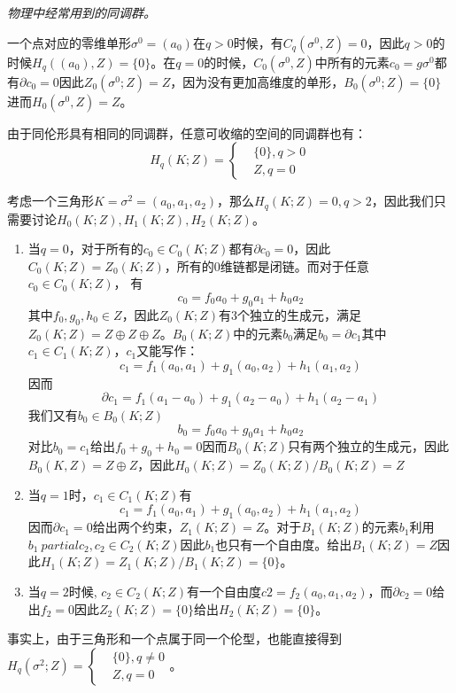 \documentclass[supercite]{HustGraduPaper}
\begin{document}
\begin{appendices}
		\textit{物理中经常用到的同调群。}
		
		一个点对应的零维单形$\sigma^0 = (a_0)$在$q>0$时候，有$C_q(\sigma^0,Z) = 0$，因此$q>0$的时候$H_q((a_0),Z) = \{0\}$。在$q = 0$的时候，$C_0(\sigma^0,Z)$中所有的元素$c_0 = g \sigma^0$都有$\partial c_0 = 0$因此$Z_0(\sigma^0;Z) = Z$，因为没有更加高维度的单形，$B_0(\sigma^0;Z) = \{0\}$进而$H_0(\sigma^0,Z) = Z$。
		
		由于同伦形具有相同的同调群，任意可收缩的空间的同调群也有：
		\begin{equation}
		H_q(K;Z) = \begin{cases}
		&\{0\}, q>0\\
		&Z, q=0
		\end{cases}
		\end{equation}
		
		考虑一个三角形$K = \sigma^2 = (a_0,a_1,a_2)$，那么$H_q(K;Z) = 0, q>2$，因此我们只需要讨论$H_0(K;Z), H_{1}(K;Z), H_2(K;Z)$。
		\begin{enumerate}
			\item 当$q = 0$，对于所有的$c_0 \in C_0(K;Z)$都有$\partial c_0 = 0$，因此$C_0(K;Z) = Z_0(K;Z)$，所有的$0$维链都是闭链。而对于任意$c_0 \in C_0(K;Z)$， 有
			\begin{equation}
			c_0 = f_0 a_0 + g_0 a_1 + h_0 a_2
			\end{equation}
			其中$f_0,g_0,h_0 \in Z$，因此$Z_0(K;Z)$有$3$个独立的生成元，满足$Z_0(K;Z) = Z \oplus Z \oplus Z$。$B_0(K;Z)$中的元素$b_0$满足$b_0 = \partial c_1$其中$c_1 \in C_1(K;Z)$，$c_1$又能写作：
			\begin{equation}
			c_1 = f_1(a_0, a_1) + g_1(a_0,a_2) + h_1(a_1,a_2) 
			\end{equation}
			因而
			\begin{equation}
			\partial c_1 = f_1(a_1 - a_0) + g_1(a_2 - a_0) + h_1(a_2 - a_1)
			\end{equation}
			我们又有$b_0 \in B_0(K;Z)$
			\begin{equation}
			b_0 = f_0 a_0 + g_0 a_1 + h_0 a_2
			\end{equation}
			对比$b_0 = c_1$给出$f_0 + g_0 + h_0 = 0$因而$B_0(K;Z)$只有两个独立的生成元，因此$B_0(K,Z) = Z\oplus Z$，因此$H_0(K;Z) = Z_0(K;Z) / B_0(K;Z) = Z$
			\item 当$q=1$时，$c_1 \in C_1(K;Z)$有
			\begin{equation}
			c_1 = f_1 (a_0,a_1) + g_1(a_0,a_2) + h_1(a_1,a_2)
			\end{equation}
			因而$\partial c_1 = 0$给出两个约束，$Z_1(K;Z) = Z$。对于$B_1(K;Z)$的元素$b_1$利用$b_1 \ partial c_2, c_2 \in C_2(K;Z)$因此$b_1$也只有一个自由度。给出$B_1(K;Z) = Z$因此$H_1(K;Z) = Z_1(K;Z)/B_1(K;Z) = \{0\}$。
			\item 当$q=2$时候, $c_2 \in C_2(K;Z)$有一个自由度$c2 = f_2 (a_0,a_1,a_2)$，而$\partial c_2 =0$给出$f_2 = 0$因此$Z_2(K;Z) = \{0\}$给出$H_2(K;Z) = \{0\}$。  	
		\end{enumerate}
		事实上，由于三角形和一个点属于同一个伦型，也能直接得到$H_q(\sigma^2;Z) = \begin{cases}
		&\{0\}, q \ne 0\\
		&Z, q=0
		\end{cases}$。
		

\end{appendices}
\end{document}
